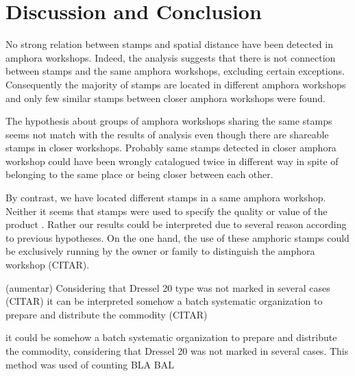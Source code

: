 \documentclass[review]{elsarticle}
\begin{document}



\section{Discussion and Conclusion}


No strong relation between stamps and spatial distance have been detected in amphora workshops.  
Indeed, the analysis suggests that there is not connection between stamps and the same amphora workshops, excluding certain exceptions. Consequently the majority of stamps are located in different amphora workshops and only few similar stamps between closer amphora workshops were found. 

The hypothesis about groups of amphora workshops sharing the same stamps seems not match with the results of analysis even though there are shareable stamps in closer workshops. Probably same stamps detected in closer amphora workshop could have been wrongly catalogued twice in different way in spite of belonging to the same place or being closer between each other. 
 


By contrast, we have located different stamps in a same amphora workshop. Neither it seems that stamps were used to specify the quality or value of the product \citep{callender}. Rather our results could be interpreted due to several reason according to previous hypotheses. On the one hand, the use of these amphoric stamps could be exclusively running by the owner or family to distinguish the amphora workshop (CITAR). 

(aumentar)
Considering that Dressel 20 type was not marked in several cases (CITAR) it can be interpreted somehow a batch systematic organization to prepare and distribute the commodity (CITAR)


it could be somehow a batch systematic organization to prepare and distribute the commodity, considering that Dressel 20 was not marked in several cases. This method was used of counting BLA BAL 

 
\end{document}

